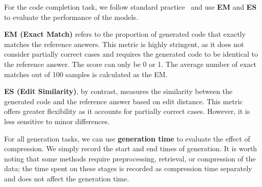 For the code completion task, we follow standard practice~\cite{Yu2023CoderEvalAB,ding2023crosscodeeval} and use \textbf{EM} and \textbf{ES} to evaluate the performance of the models.

\textbf{EM (Exact Match)} refers to the proportion of generated code that exactly matches the reference answers. This metric is highly stringent, as it does not consider partially correct cases and requires the generated code to be identical to the reference answer. The score can only be 0 or 1. The average number of exact matches out of 100 samples is calculated as the EM.

\textbf{ES (Edit Similarity)}, by contrast, measures the similarity between the generated code and the reference answer based on edit distance. This metric offers greater flexibility as it accounts for partially correct cases. However, it is less sensitive to minor differences.

For all generation tasks, we can use \textbf{generation time} to evaluate the effect of compression. We simply record the start and end times of generation. It is worth noting that some methods require preprocessing, retrieval, or compression of the data; the time spent on these stages is recorded as compression time separately and does not affect the generation time.





